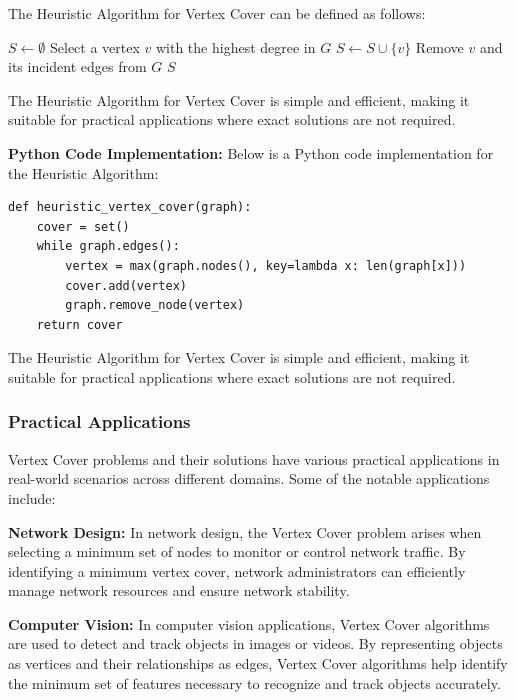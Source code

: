 \documentclass[12pt]{book} %
\begin{document}
The Heuristic Algorithm for Vertex Cover can be defined as follows:
\FloatBarrier
\begin{algorithm}
\caption{Heuristic Vertex Cover}
\begin{algorithmic}[1]
\State $S \gets \emptyset$
    \State Select a vertex $v$ with the highest degree in $G$
    \State $S \gets S \cup \{v\}$
    \State Remove $v$ and its incident edges from $G$
\EndWhile
\State \Return $S$
\EndFunction
\end{algorithmic}
\end{algorithm}
\FloatBarrier
The Heuristic Algorithm for Vertex Cover is simple and efficient, making it suitable for practical applications where exact solutions are not required.

\textbf{Python Code Implementation:} 
Below is a Python code implementation for the Heuristic Algorithm:
\FloatBarrier
\begin{lstlisting}
def heuristic_vertex_cover(graph):
    cover = set()
    while graph.edges():
        vertex = max(graph.nodes(), key=lambda x: len(graph[x]))
        cover.add(vertex)
        graph.remove_node(vertex)
    return cover
\end{lstlisting}
\FloatBarrier
The Heuristic Algorithm for Vertex Cover is simple and efficient, making it suitable for practical applications where exact solutions are not required.

\subsubsection{Practical Applications}

Vertex Cover problems and their solutions have various practical applications in real-world scenarios across different domains. Some of the notable applications include:

\textbf{Network Design:} In network design, the Vertex Cover problem arises when selecting a minimum set of nodes to monitor or control network traffic. By identifying a minimum vertex cover, network administrators can efficiently manage network resources and ensure network stability.

\textbf{Computer Vision:} In computer vision applications, Vertex Cover algorithms are used to detect and track objects in images or videos. By representing objects as vertices and their relationships as edges, Vertex Cover algorithms help identify the minimum set of features necessary to recognize and track objects accurately.
\end{document}
